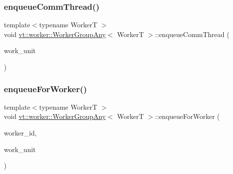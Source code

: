 \mbox{\label{structvt_1_1worker_1_1_worker_group_any_a876ea312a8cefa1caa8bbf86caff208d}} 
\subsubsection{\texorpdfstring{enqueue\+Comm\+Thread()}{enqueueCommThread()}}
{\footnotesize\ttfamily template$<$typename WorkerT $>$ \\
void \hyperlink{structvt_1_1worker_1_1_worker_group_any}{vt\+::worker\+::\+Worker\+Group\+Any}$<$ WorkerT $>$\+::enqueue\+Comm\+Thread (\begin{DoxyParamCaption}\item[{\hyperlink{namespacevt_1_1worker_a59d2fcdafa81fc0af7f921a258e42202}{Work\+Unit\+Type} const \&}]{work\+\_\+unit }\end{DoxyParamCaption})}

\mbox{\label{structvt_1_1worker_1_1_worker_group_any_a7f800682c86f876c626d3ee1b9735680}} 
\subsubsection{\texorpdfstring{enqueue\+For\+Worker()}{enqueueForWorker()}}
{\footnotesize\ttfamily template$<$typename WorkerT $>$ \\
void \hyperlink{structvt_1_1worker_1_1_worker_group_any}{vt\+::worker\+::\+Worker\+Group\+Any}$<$ WorkerT $>$\+::enqueue\+For\+Worker (\begin{DoxyParamCaption}\item[{\hyperlink{namespacevt_a656e362091da17b9b93d0655b36e3392}{Worker\+I\+D\+Type} const \&}]{worker\+\_\+id,  }\item[{\hyperlink{namespacevt_1_1worker_a59d2fcdafa81fc0af7f921a258e42202}{Work\+Unit\+Type} const \&}]{work\+\_\+unit }\end{DoxyParamCaption})}

